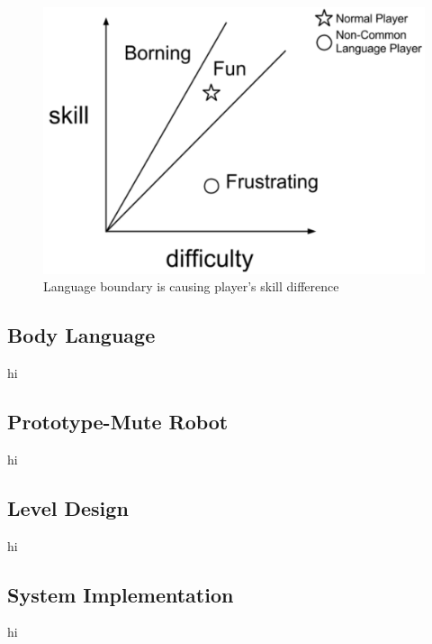 \begin{figure}[!h]
\centering
\includegraphics[width=0.9\columnwidth]{Figures/GD_F1.png}
\caption{Language boundary is causing player's skill difference}
\label{fig:GD_F1}
\end{figure}

\subsection{Body Language}
hi
\subsection{Prototype-Mute Robot}
hi
\subsection{Level Design}
hi
\subsection{System Implementation}
hi